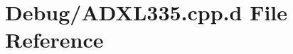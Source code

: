 \hypertarget{_debug_2_a_d_x_l335_8cpp_8d}{\section{\-Debug/\-A\-D\-X\-L335.cpp.\-d \-File \-Reference}
\label{_debug_2_a_d_x_l335_8cpp_8d}
}
